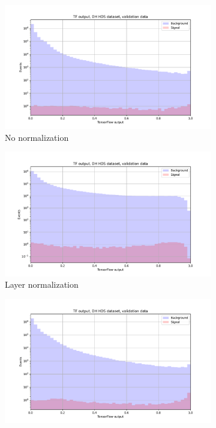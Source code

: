 \documentclass[12pt, a4paper]{book}
\begin{document}
\begin{figure}[!ht]
	\centering
	\begin{subfigure}[b]{0.49\textwidth}
      \centering
      \includegraphics[width=1\textwidth]{NoNorm/VAL_pre.pdf}
      \caption{No normalization}
   \end{subfigure}
   \hfill
   \begin{subfigure}[b]{0.49\textwidth}
      \centering
      \includegraphics[width=1\textwidth]{LayerNorm/VAL_pre.pdf}
      \caption{Layer normalization}
   \end{subfigure}
   \hfill
	\begin{subfigure}[b]{0.49\textwidth}
      \centering
      \includegraphics[width=1\textwidth]{minmax/VAL_pre.pdf}

\end{subfigure}
\end{figure}
\end{document}
